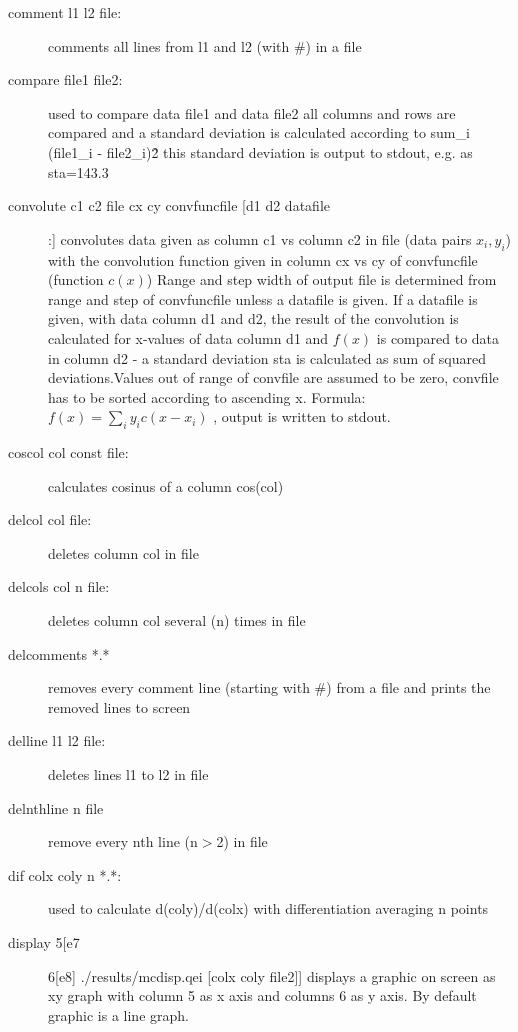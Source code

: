 \begin{description}
\item [\prg comment l1 l2 file:] comments all lines from l1 and l2  (with \#) in a file
\item [\prg compare file1 file2:] used to compare data file1 and data file2
                all columns and rows are compared and a standard deviation
                is calculated according to sum\_i (file1\_i - file2\_i)\^2
                this standard deviation is output to stdout, e.g. as sta=143.3
\item [\prg convolute c1 c2 file cx cy convfuncfile [d1 d2 datafile]:] %
convolutes data given as column c1 vs column
                       c2 in file (data pairs $x_i,y_i$) with the convolution function given in %
column cx vs cy
		        of convfuncfile (function $c(x)$)
		       Range and step width of output file is determined from range and step 
		        of convfuncfile  unless a datafile is given. If a datafile is given, 
		     with data column d1 and d2, the result of the convolution is
		     calculated for x-values of data column d1 and $f(x)$ is compared to
		     data in column d2 - a standard deviation sta is calculated as
		     sum of squared deviations.Values out of range of convfile are assumed to be zero,
			convfile has to be sorted according to ascending x.
			Formula: $f(x)=\sum_i y_i c(x-x_i)$ , 
		       output is written to stdout. 
\item [\prg coscol col const file:] calculates cosinus of a column cos(col) 
\item [\prg delcol col file:] deletes column col in file
\item [\prg delcols col n file:] deletes column col several (n) times in file
\item [\prg delcomments *.*] removes every comment line (starting with \#) from a file and %
prints the removed lines to screen
\item [\prg delline l1 l2 file:] deletes lines l1 to l2  in file
\item [\prg delnthline n file]  remove every nth line (n$>$2) in file
\item [\prg dif colx coly n *.*:] used to calculate d(coly)/d(colx) with %
differentiation averaging n points
\item [\prg display 5[e7] 6[e8]  ./results/mcdisp.qei {[colx coly file2]}] displays a graphic on screen as xy %
graph
with column 5 as x axis and columns 6 as y axis. By default graphic is a line graph.

\end{description}
